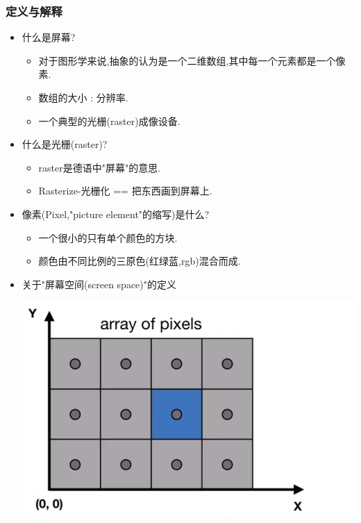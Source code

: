 \documentclass[UTF8,12pt]{ctexbook}
\begin{document}
{{{{      \subsubsection{定义与解释}{
        \begin{itemize}
          \item {
                什么是屏幕?
                \begin{itemize}
                  \item 对于图形学来说,抽象的认为是一个二维数组,其中每一个元素都是一个像素.
                  \item 数组的大小 : 分辨率.
                  \item 一个典型的光栅(raster)成像设备.
                \end{itemize}
                }
          \item{
                什么是光栅(raster)?
                \begin{itemize}
                  \item raster是德语中"屏幕"的意思.
                  \item Rasterize-光栅化 == 把东西画到屏幕上.
                \end{itemize}
                }
          \item{
                像素(Pixel,"picture element"的缩写)是什么?
                \begin{itemize}
                  \item 一个很小的只有单个颜色的方块.
                  \item 颜色由不同比例的三原色(红绿蓝,rgb)混合而成.
                \end{itemize}
                }
          \item{
                关于"屏幕空间(screen space)"的定义

                \begin{center}
                  \includegraphics[scale=0.5]{resources/define_of_screen_space_1.png}
                \end{center}

}
\end{itemize}}}}}}
\end{document}
